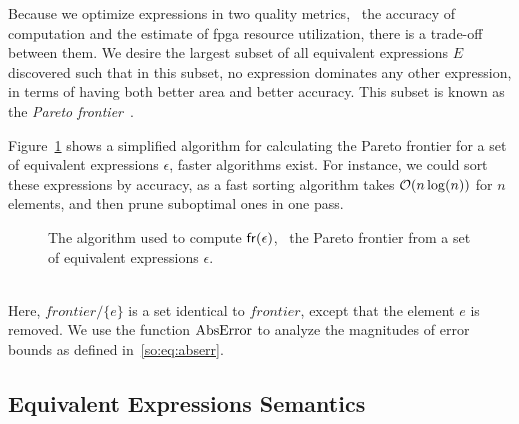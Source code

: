 Because we optimize expressions in two quality metrics, \ie~the accuracy of
computation and the estimate of \gls{fpga} resource utilization, there is
a trade-off between them. We desire the largest subset of all equivalent
expressions $E$ discovered such that in this subset, no expression dominates
any other expression, in terms of having both better area and better
accuracy. This subset is known as the \emph{Pareto frontier}~\cite{legriel10}.

Figure~\ref{so:alg:pareto} shows a simplified algorithm for calculating
the Pareto frontier for a set of equivalent expressions $\epsilon$, faster
algorithms exist.  For instance, we could sort these expressions by accuracy,
as a fast sorting algorithm takes $\operatorname{\mathcal{O}}(n\log(n))$ for $n$ elements, and then
prune suboptimal ones in one pass.
\begin{figure}[ht]
    \centering
    \begin{algorithmic}
        \singlespacing%
                    \EndIf{}
                \EndFor{}
            \EndFor{}
        \EndFunction%
    \end{algorithmic}
    \caption{%
        The algorithm used to compute $\operatorname{\mathsf{fr}}(\epsilon)$, \ie~the Pareto
        frontier from a set of equivalent expressions $\epsilon$.
    }\label{so:alg:pareto}
\end{figure} \\
Here, $\mathit{frontier} / \{ e \}$ is a set identical to $\mathit{frontier}$,
except that the element $e$ is removed.  We use the function $\operatorname{\mathrm{AbsError}}$ to
analyze the magnitudes of error bounds as defined in~\eqref{so:eq:abserr}.


\subsection{Equivalent Expressions Semantics}
\label{so:sub:equivalent_semantics}

